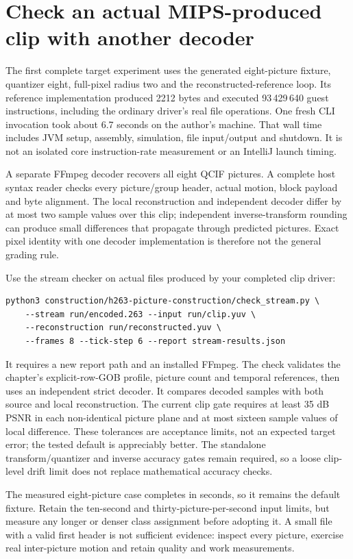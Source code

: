 \section{Check an actual MIPS-produced clip with another decoder}
The first complete target experiment uses the generated eight-picture fixture,
quantizer eight, full-pixel radius two and the reconstructed-reference loop.
Its reference implementation produced 2212 bytes and executed 93\,429\,640 guest
instructions, including the ordinary driver's real file operations. One fresh
CLI invocation took about 6.7 seconds on the author's machine. That wall time
includes JVM setup, assembly, simulation, file input/output and shutdown. It is
not an isolated core instruction-rate measurement or an IntelliJ launch timing.

A separate FFmpeg decoder recovers all eight QCIF pictures. A complete host
syntax reader checks every picture/group header, actual motion, block payload
and byte alignment. The local reconstruction and independent decoder differ by
at most two sample values over this clip; independent inverse-transform rounding
can produce small differences that propagate through predicted pictures. Exact
pixel identity with one decoder implementation is therefore not the general
grading rule.

Use the stream checker on actual files produced by your completed clip driver:
\begin{verbatim}
python3 construction/h263-picture-construction/check_stream.py \
    --stream run/encoded.263 --input run/clip.yuv \
    --reconstruction run/reconstructed.yuv \
    --frames 8 --tick-step 6 --report stream-results.json
\end{verbatim}
It requires a new report path and an installed FFmpeg. The check validates the
chapter's explicit-row-GOB profile, picture count and temporal references, then
uses an independent strict decoder. It compares decoded samples with both source
and local reconstruction. The current clip gate requires at least 35 dB PSNR in
each non-identical picture plane and at most sixteen sample values of local
difference. These tolerances are acceptance limits, not an expected target error;
the tested default is appreciably better. The standalone transform/quantizer and
inverse accuracy gates remain required, so a loose clip-level drift limit does
not replace mathematical accuracy checks.

The measured eight-picture case completes in seconds, so it remains the default
fixture. Retain the ten-second and thirty-picture-per-second input limits, but
measure any longer or denser class assignment before adopting it. A small file
with a valid first header is not sufficient evidence: inspect every picture,
exercise real inter-picture motion and retain quality and work measurements.
